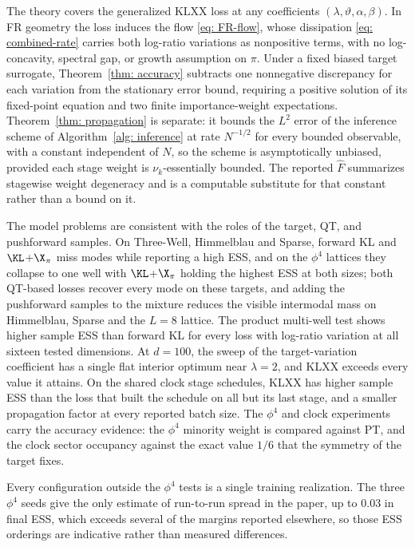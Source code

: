 \documentclass{article}
\begin{document}
The theory covers the generalized KLXX loss at any coefficients $(\lambda,\vartheta,\alpha,\beta)$. In FR geometry the loss induces the flow \eqref{eq: FR-flow}, whose dissipation \eqref{eq: combined-rate} carries both log-ratio variations as nonpositive terms, with no log-concavity, spectral gap, or growth assumption on $\pi$. Under a fixed biased target surrogate, Theorem~\ref{thm: accuracy} subtracts one nonnegative discrepancy for each variation from the stationary error bound, requiring a positive solution of its fixed-point equation and two finite importance-weight expectations. Theorem~\ref{thm: propagation} is separate: it bounds the $L^2$ error of the inference scheme of Algorithm~\ref{alg: inference} at rate $N^{-1/2}$ for every bounded observable, with a constant independent of $N$, so the scheme is asymptotically unbiased, provided each stage weight is $\nu_k$-essentially bounded. The reported $\hat F$ summarizes stagewise weight degeneracy and is a computable substitute for that constant rather than a bound on it.

The model problems are consistent with the roles of the target, QT, and pushforward samples. On Three-Well, Himmelblau and Sparse, forward KL and $\KL$+$\X_\pi$ miss modes while reporting a high ESS, and on the $\phi^4$ lattices they collapse to one well with $\KL$+$\X_\pi$ holding the highest ESS at both sizes; both QT-based losses recover every mode on these targets, and adding the pushforward samples to the mixture reduces the visible intermodal mass on Himmelblau, Sparse and the $L=8$ lattice. The product multi-well test shows higher sample ESS than forward KL for every loss with log-ratio variation at all sixteen tested dimensions. At $d=100$, the sweep of the target-variation coefficient has a single flat interior optimum near $\lambda=2$, and KLXX exceeds every value it attains. On the shared clock stage schedules, KLXX has higher sample ESS than the loss that built the schedule on all but its last stage, and a smaller propagation factor at every reported batch size. The $\phi^4$ and clock experiments carry the accuracy evidence: the $\phi^4$ minority weight is compared against PT, and the clock sector occupancy against the exact value $1/6$ that the symmetry of the target fixes.

Every configuration outside the $\phi^4$ tests is a single training realization. The three $\phi^4$ seeds give the only estimate of run-to-run spread in the paper, up to $0.03$ in final ESS, which exceeds several of the margins reported elsewhere, so those ESS orderings are indicative rather than measured differences.
\end{document}
